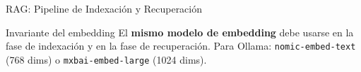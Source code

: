 \documentclass[aspectratio=169]{beamer}
\begin{document}
\begin{frame}{RAG: Pipeline de Indexación y Recuperación}
\begin{center}
\end{center}

\vspace{0.2em}
\begin{block}{Invariante del embedding}
  El \textbf{mismo modelo de embedding} debe usarse en la fase de indexación
  y en la fase de recuperación. Para Ollama: \texttt{nomic-embed-text}
  (768 dims) o \texttt{mxbai-embed-large} (1024 dims).
\end{block}
\end{frame}

\end{document}
